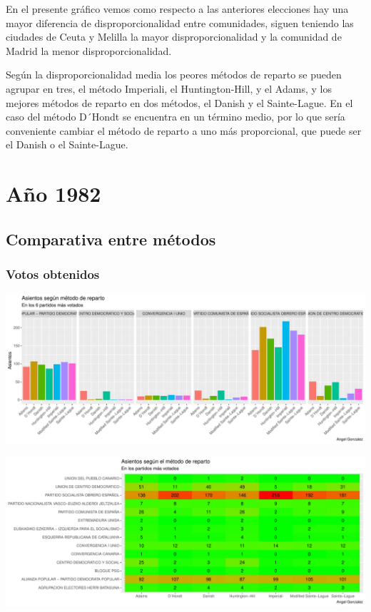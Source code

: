 \documentclass[12pt,a4paper,]{book}
\numberwithin{dummy}{section}
\theoremstyle{ocrenumbox}
\theoremstyle{blacknumex}
\theoremstyle{blacknumbox}
\theoremstyle{ocrenum}
\theoremstyle{ocrenum}
\begin{document}
En el presente gráfico vemos como respecto a las anteriores elecciones
hay una mayor diferencia de disproporcionalidad entre comunidades,
siguen teniendo las ciudades de Ceuta y Melilla la mayor
disproporcionalidad y la comunidad de Madrid la menor
disproporcionalidad.

Según la disproporcionalidad media los peores métodos de reparto se
pueden agrupar en tres, el método Imperiali, el Huntington-Hill, y el
Adams, y los mejores métodos de reparto en dos métodos, el Danish y el
Sainte-Lague. En el caso del método D´Hondt se encuentra en un término
medio, por lo que sería conveniente cambiar el método de reparto a uno
más proporcional, que puede ser el Danish o el Sainte-Lague.

\hypertarget{auxf1o-1982}{%
\section{Año 1982}\label{auxf1o-1982}}

\hypertarget{comparativa-entre-muxe9todos-2}{%
\subsection{Comparativa entre
métodos}\label{comparativa-entre-muxe9todos-2}}

\hypertarget{votos-obtenidos-2}{%
\subsubsection{Votos obtenidos}\label{votos-obtenidos-2}}

\begin{center}\includegraphics[width=0.95\linewidth]{figurasR/unnamed-chunk-77-1} \end{center}

\begin{center}\includegraphics[width=0.95\linewidth]{figurasR/unnamed-chunk-77-2} \end{center}
\end{document}
